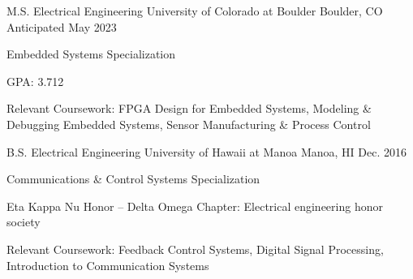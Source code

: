 

\begin{cventries}

  \cventry
    {M.S. Electrical Engineering} %
    {University of Colorado at Boulder} %
    {Boulder, CO} %
    {Anticipated May 2023} %
    {
        \begin{cvitems} %
            \item {Embedded Systems Specialization}
            \item {GPA: 3.712}
            \item {Relevant Coursework: FPGA Design for Embedded Systems, Modeling \& Debugging Embedded Systems, Sensor Manufacturing \& Process Control} %
        \end{cvitems}
    }

  \cventry
    {B.S. Electrical Engineering} %
    {University of Hawaii at Manoa} %
    {Manoa, HI} %
    {Dec. 2016} %
    {
        \begin{cvitems} %
            \item {Communications \& Control Systems Specialization}
            \item {Eta Kappa Nu Honor -- Delta Omega Chapter: Electrical engineering honor society}
            \item {Relevant Coursework: Feedback Control Systems, Digital Signal Processing, Introduction to Communication Systems} %
        \end{cvitems}
    }

\end{cventries}
